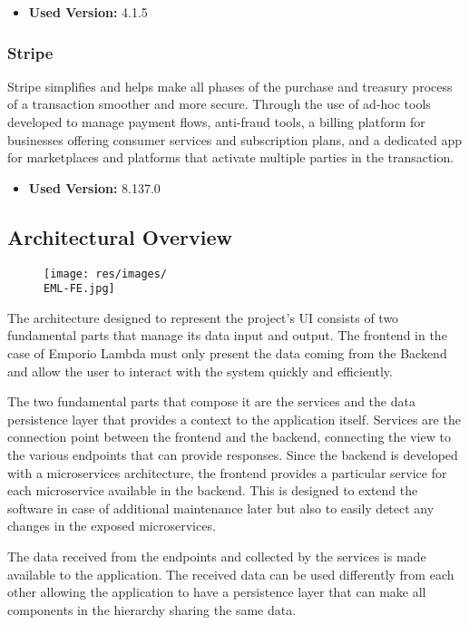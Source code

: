 \begin{itemize}
    \item \textbf{Used Version:} 4.1.5 
\end{itemize}

\subsubsection{Stripe}
Stripe simplifies and helps make all phases of the purchase and treasury process of a transaction smoother and more secure. Through the use of ad-hoc tools developed to manage payment flows, anti-fraud tools, a billing platform for businesses offering consumer services and subscription plans, and a dedicated app for marketplaces and platforms that activate multiple parties in the transaction.

\begin{itemize}
    \item \textbf{Used Version:} 8.137.0
\end{itemize}

\subsection{Architectural Overview}

\begin{figure}[H]
    \centering
    \texttt{[image: res/images/\\EML-FE.jpg]}
\end{figure}

The architecture designed to represent the project's UI consists of two fundamental parts that manage its data input and output. The frontend in the case of Emporio Lambda must only present the data coming from the Backend and allow the user to interact with the system quickly and efficiently. 

The two fundamental parts that compose it are the services and the data persistence layer that provides a context to the application itself. Services are the connection point between the frontend and the backend, connecting the view to the various endpoints that can provide responses. Since the backend is developed with a microservices architecture, the frontend provides a particular service for each microservice available in the backend. This is designed to extend the software in case of additional maintenance later but also to easily detect any changes in the exposed microservices. 

The data received from the endpoints and collected by the services is made available to the application. The received data can be used differently from each other allowing the application to have a persistence layer that can make all components in the hierarchy sharing the same data. 

